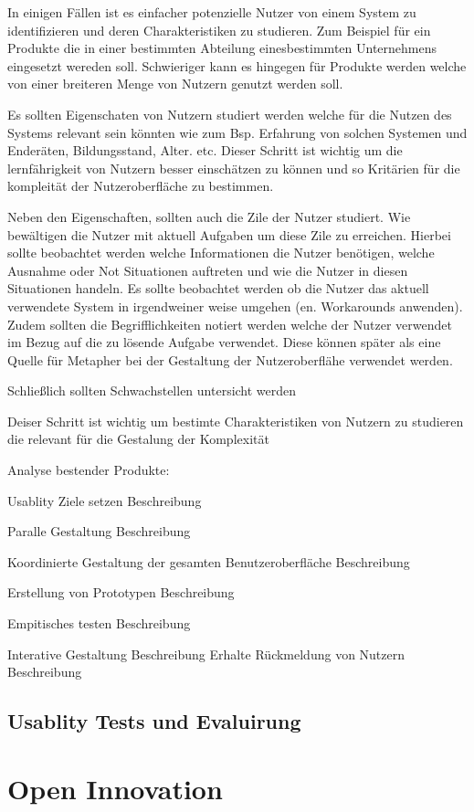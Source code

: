 In einigen Fällen ist es einfacher potenzielle Nutzer von einem System zu identifizieren und deren Charakteristiken zu studieren. Zum Beispiel für ein Produkte die in einer bestimmten 
Abteilung einesbestimmten Unternehmens eingesetzt wereden soll. Schwieriger kann es hingegen für Produkte werden welche von einer breiteren Menge von Nutzern genutzt werden soll.

Es sollten Eigenschaten von Nutzern studiert werden welche für die Nutzen des Systems relevant sein könnten wie zum Bsp. Erfahrung von solchen Systemen und Enderäten, Bildungsstand, Alter. etc.
Dieser Schritt ist wichtig um die lernfährigkeit von Nutzern besser einschätzen zu können und so Kritärien für die kompleität der Nutzeroberfläche zu bestimmen.

Neben den Eigenschaften, sollten auch die Zile der Nutzer studiert. Wie bewältigen die  Nutzer mit aktuell Aufgaben um diese Zile zu erreichen. Hierbei sollte beobachtet werden welche Informationen 
die Nutzer benötigen, welche Ausnahme oder Not Situationen auftreten und wie die Nutzer in diesen Situationen handeln. Es sollte beobachtet werden ob die Nutzer das aktuell verwendete System in irgendweiner 
weise umgehen (en. Workarounds anwenden). Zudem sollten die Begrifflichkeiten notiert werden welche der Nutzer verwendet im Bezug auf die zu lösende Aufgabe verwendet.  
Diese können später als eine Quelle für Metapher bei der Gestaltung der Nutzeroberflähe verwendet werden. 

Schließlich sollten Schwachstellen untersicht werden 



Deiser Schritt ist wichtig um bestimte Charakteristiken von Nutzern zu studieren die relevant für die Gestalung der Komplexität 


Analyse bestender Produkte: 

		Usablity Ziele setzen  Beschreibung

		Paralle Gestaltung   Beschreibung

		Koordinierte Gestaltung der gesamten Benutzeroberfläche  Beschreibung 

		 Erstellung von Prototypen  Beschreibung 

		Empitisches testen  Beschreibung 

		Interative Gestaltung  Beschreibung 
		 Erhalte Rückmeldung von Nutzern  Beschreibung 






\subsection{Usablity Tests und Evaluirung}


\section{Open Innovation}




